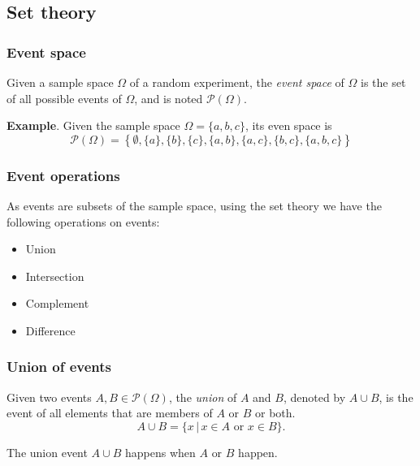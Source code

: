 \subsection{Set theory}

\begin{frame}
\frametitle{Event space}
\begin{definition} Given a sample space $\Omega$ of a random experiment, the \emph{event space} of
$\Omega$ is the set of all possible events of $\Omega$, and is noted $\mathcal{P}(\Omega)$.
\end{definition}

\textbf{Example}. Given the sample space $\Omega=\{a,b,c\}$, its even space is 
\[
\mathcal{P}(\Omega)=\left\{\emptyset, \{a\},\{b\},\{c\},\{a,b\},\{a,c\},\{b,c\},\{a,b,c\}\right\}
\]
\end{frame}


\begin{frame}
\frametitle{Event operations}
As events are subsets of the sample space, using the set theory we have the following operations on events:
\begin{itemize}
\item Union
\item Intersection
\item Complement
\item Difference
\end{itemize}
\end{frame}


\begin{frame}
\frametitle{Union of events}
\begin{definition}
Given two events $A,B\in \mathcal{P}(\Omega)$, the \emph{union} of $A$ and $B$, denoted by $A\cup B$, is the event of
all elements that are members of $A$ or $B$ or both.
\[
A\cup B = \{x\,|\, x\in A\textrm{ or }x\in B\}.
\]
\end{definition}

\begin{center}

\end{center}
The union event $A\cup B$ happens when $A$ \alert{or} $B$ happen.
\end{frame}


